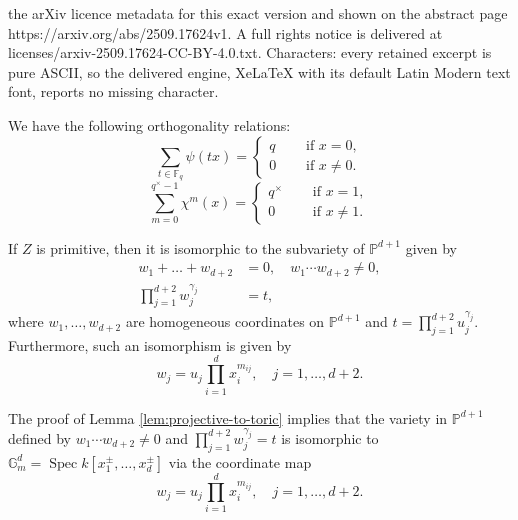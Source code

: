 \documentclass[10pt,a4paper]{amsart}
\newcommand{\F}{\mathbb{F}}
\newcommand{\G}{\mathbb{G}}
\newcommand{\Ps}{\mathbb{P}}
\newcommand{\Spec}{\operatorname{Spec}}
\begin{document}
the arXiv licence metadata for this exact version and shown on the abstract page https://arxiv.org/abs/2509.17624v1. A full rights notice is delivered at licenses/arxiv-2509.17624-CC-BY-4.0.txt. Characters: every retained excerpt is pure ASCII, so the delivered engine, XeLaTeX with its default Latin Modern text font, reports no missing character.
\begin{lem} \label{lem:orthogonal} We have the following orthogonality relations:
\begin{equation*}
    \sum_{t \in \F_q} \psi(tx) = \begin{cases}
        q \quad & \text{ if } x =0,\\
        0 \quad & \text{ if } x\neq 0.
    \end{cases}
\end{equation*}
\begin{equation*}
   \sum_{m=0}^{q^\times-1} \chi^{m}(x) =   \begin{cases}
        q^\times \quad & \text{ if }x =1,\\
        0 \quad & \text{ if } x \neq 1.
        \end{cases}
\end{equation*}
\end{lem}

\begin{lem}\label{lem:projective-to-toric}
   If $Z$ is primitive, then it is isomorphic to the subvariety of $\Ps^{d+1}$ given by 
   \begin{align*}
    w_1+\dots +w_{d+2} &=0, \quad     w_1\cdots w_{d+2} \neq 0,\\
    \prod_{j=1}^{d+2} w_j^{\gamma_j} &=t,
    \end{align*}
    where  $w_1,\dots, w_{d+2}$ are homogeneous coordinates on $\Ps^{d+1}$ and $t = \prod_{j=1}^{d+2} u_j^{\gamma_j}$. Furthermore, such an isomorphism is given by 
    \[
    w_j = u_j \prod_{i=1}^{d} x_i^{m_{ij}},  \quad j=1,\dots, {d+2} .
    \]
\end{lem}

\begin{rem}\label{rem:primitive-dehomogenization}
The proof of Lemma \ref{lem:projective-to-toric} implies that the variety in $\Ps^{d+1}$ defined by $w_1\cdots w_{d+2} \neq 0$ 
and $\prod_{j=1}^{d+2} w_j^{\gamma_j} =t$ is isomorphic to $\G_m^{d} = \Spec k[x_1^{\pm},\dots,x_d^{\pm}]$ via the coordinate map
\[
w_j = u_j \prod_{i=1}^{d} x_i^{m_{ij}}, \quad j=1,\dots, d+2.
\]
\end{rem}
\end{document}
